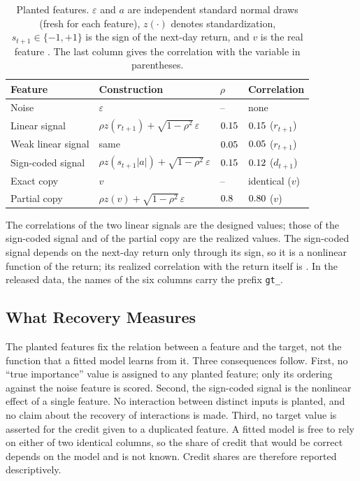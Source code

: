 \documentclass[conference]{IEEEtran}
\begin{document}
\begin{table}[t]
\caption{Planted features. $\varepsilon$ and $a$ are independent standard
normal draws (fresh for each feature), $z(\cdot)$ denotes standardization,
$s_{t+1}\in\{-1,+1\}$ is the sign of the next-day return, and $v$ is the
real feature \texttt{\gtSource}. The last column gives the correlation with
the variable in parentheses.}
\label{tab:planted}
\centering\footnotesize
\setlength{\tabcolsep}{4pt}
\begin{tabular}{@{}llll@{}}
\toprule
Feature & Construction & $\rho$ & Correlation \\
\midrule
Noise & $\varepsilon$ & -- & none \\
Linear signal & $\rho z(r_{t+1})+\sqrt{1-\rho^2}\,\varepsilon$ & $0.15$ & $0.15$ ($r_{t+1}$) \\
Weak linear signal & same & $0.05$ & $0.05$ ($r_{t+1}$) \\
Sign-coded signal & $\rho z(s_{t+1}|a|)+\sqrt{1-\rho^2}\,\varepsilon$ & $0.15$ & $0.12$ ($d_{t+1}$) \\
Exact copy & $v$ & -- & identical ($v$) \\
Partial copy & $\rho z(v)+\sqrt{1-\rho^2}\,\varepsilon$ & $0.8$ & $0.80$ ($v$) \\
\bottomrule
\end{tabular}
\end{table}

The correlations of the two linear signals are the designed values; those of
the sign-coded signal and of the partial copy are the realized values. The
sign-coded signal depends on the next-day return only through its sign, so
it is a nonlinear function of the return; its realized correlation with the
return itself is \gtNlCorrRet. In the released data, the names of the six
columns carry the prefix \texttt{gt\_}.

\subsection{What Recovery Measures}
\label{sec:meaning}
The planted features fix the relation between a feature and the target, not
the function that a fitted model learns from it. Three consequences follow.
First, no ``true importance'' value is assigned to any planted feature; only
its ordering against the noise feature is scored. Second, the sign-coded
signal is the nonlinear effect of a single feature. No interaction between
distinct inputs is planted, and no claim about the recovery of interactions
is made. Third, no target value is asserted for the credit given to a
duplicated feature. A fitted model is free to rely on either of two
identical columns, so the share of credit that would be correct depends on
the model and is not known. Credit shares are therefore reported
descriptively.
\end{document}
